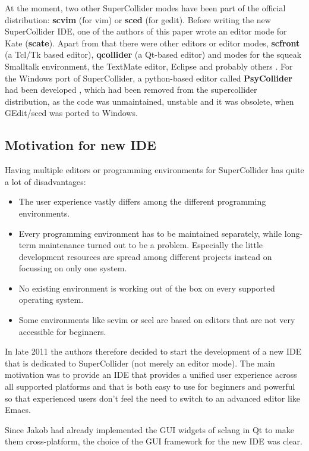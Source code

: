 \documentclass[11pt,a4paper]{article}
\begin{document}
At the moment, two other SuperCollider modes have been part of the official distribution: \textbf{scvim} (for vim) or
\textbf{sced} (for gedit). Before writing the new SuperCollider IDE, one of the authors of this paper
wrote an editor mode for Kate (\textbf{scate}). Apart from that there were other editors or editor modes,
\textbf{scfront} (a Tcl/Tk based editor), \textbf{qcollider} (a Qt-based editor) and modes for the squeak Smalltalk
environment, the TextMate editor, Eclipse and probably others \cite{collision}. For the Windows port of SuperCollider, a
python-based editor called \textbf{PsyCollider} had been developed \cite{dos}, which had been removed from the
supercollider distribution, as the code was unmaintained, unstable and it was obsolete, when GEdit/sced was ported to
Windows.

\subsection{Motivation for new IDE}

Having multiple editors or programming environments for SuperCollider has quite a lot of disadvantages:

\begin{itemize}
\item The user experience vastly differs among the different programming environments.
\item Every programming environment has to be maintained separately, while long-term maintenance turned out to be a
  problem. Especially the little development resources are spread among different projects instead on focussing on only
  one system.
\item No existing environment is working out of the box on every supported operating system.
\item Some environments like scvim or scel are based on editors that are not very accessible for beginners.
\end{itemize}

In late 2011 the authors therefore decided to start the development of a new IDE that is dedicated to SuperCollider (not
merely an editor mode). The main motivation was to provide an IDE that provides a unified user experience across all
supported platforms and that is both easy to use for beginners and powerful so that experienced users don't feel the
need to switch to an advanced editor like Emacs.

Since Jakob had already implemented the GUI widgets of sclang in Qt to make them cross-platform, the choice of the GUI
framework for the new IDE was clear.
\end{document}
